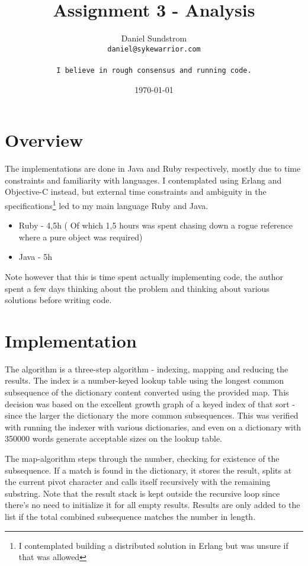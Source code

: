 \documentclass[a4paper,10pt]{article}
\title{Assignment 3 - Analysis}
\author{Daniel Sundstrom \\ 
  \texttt{daniel@sykewarrior.com}\\\\
  \texttt{I believe in rough consensus and running code.}}
\date{\today}
\begin{document}
\maketitle

\section{Overview}
The implementations are done in Java and Ruby respectively, mostly due to time constraints and familiarity with languages. 
I contemplated using Erlang and Objective-C instead, but external time constraints and ambiguity in the specifications\footnote{I contemplated building a distributed solution in Erlang but was unsure if that was allowed} led to my main language Ruby and 
Java.
\begin{itemize}
\item{Ruby} - 4,5h ( Of which 1,5 hours was spent chasing down a rogue reference where a pure object was required)
\item{Java} - 5h
\end{itemize}
Note however that this is time spent actually implementing code, the author spent a few days thinking about the problem and thinking about various solutions before writing code.

\section{Implementation}
The algorithm is a three-step algorithm - indexing, mapping and reducing the results. The index is a number-keyed lookup table using the longest common subsequence of the dictionary content converted using the provided map. This decision was based on the excellent growth graph of a keyed index of that sort - since the larger the dictionary the more common subsequences. This was verified with running the indexer with various dictionaries, and even on a dictionary with 350000 words generate acceptable sizes on the lookup table. 

The map-algorithm steps through the number, checking for existence of the subsequence. If a match is found in the dictionary, it stores the result, splits at the current pivot character and calls itself recursively with the remaining substring. Note that the result stack is kept outside the recursive loop since there's no need to initialize it for all empty results. Results are only added to the list if the total combined subsequence matches the number in length.
\end{document}
